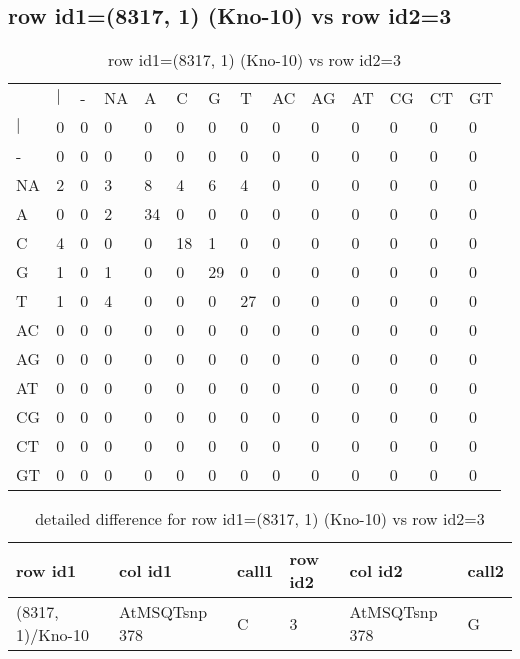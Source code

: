 \subsection{row id1=(8317, 1) (Kno-10) vs row id2=3}
\begin{center}
\begin{longtable}{|l|l|l|l|l|l|l|l|l|l|l|l|l|l|}
\caption{row id1=(8317, 1) (Kno-10) vs row id2=3} \label{table_dm312}\\
\hline
\\
\hline
&$|$&-&NA&A&C&G&T&AC&AG&AT&CG&CT&GT\\
$|$&0&0&0&0&0&0&0&0&0&0&0&0&0\\
-&0&0&0&0&0&0&0&0&0&0&0&0&0\\
NA&2&0&3&8&4&6&4&0&0&0&0&0&0\\
A&0&0&2&34&0&0&0&0&0&0&0&0&0\\
C&4&0&0&0&18&1&0&0&0&0&0&0&0\\
G&1&0&1&0&0&29&0&0&0&0&0&0&0\\
T&1&0&4&0&0&0&27&0&0&0&0&0&0\\
AC&0&0&0&0&0&0&0&0&0&0&0&0&0\\
AG&0&0&0&0&0&0&0&0&0&0&0&0&0\\
AT&0&0&0&0&0&0&0&0&0&0&0&0&0\\
CG&0&0&0&0&0&0&0&0&0&0&0&0&0\\
CT&0&0&0&0&0&0&0&0&0&0&0&0&0\\
GT&0&0&0&0&0&0&0&0&0&0&0&0&0\\
\hline
\end{longtable}
\end{center}

\begin{center}
\begin{longtable}{|l|l|l|l|l|l|}
\caption{detailed difference for row id1=(8317, 1) (Kno-10) vs row id2=3} \label{table_dm313}\\
\hline
row id1&col id1&call1&row id2&col id2&call2\\
\hline
(8317, 1)/Kno-10&AtMSQTsnp 378&C&3&AtMSQTsnp 378&G\\
\hline
\end{longtable}
\end{center}

